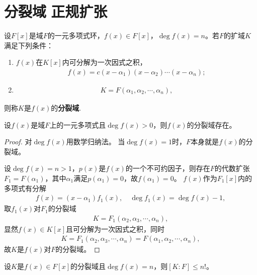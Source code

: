 \documentclass[../../main.tex]{subfiles}%
\begin{document}
\section{分裂域$\,\,$正规扩张}

\begin{definition}
设$F[x]$是域$F$的一元多项式环，$f(x)\in F[x]$，$\deg f(x)=n$。若$F$的扩域$K$满足下列条件：
\begin{enumerate}[(1)]
\item $f(x)$在$K[x]$内可分解为一次因式之积，
\begin{align}
f(x)=c(x-\alpha_1)(x-\alpha_2)\cdots(x-\alpha_n);\label{eq:split-fact}
\end{align}
\item \begin{align}K=F(\alpha_1,\alpha_2,\cdots,\alpha_n),\label{eq:split-gen}
\end{align}
\end{enumerate}
则称$K$是$f(x)$的\textbf{分裂域}.
\end{definition}

\begin{theorem}
设$f(x)$是域$F$上的一元多项式且$\deg f(x)>0$，则$f(x)$的分裂域存在。
\end{theorem}
\begin{proof}

对$\deg f(x)$用数学归纳法。
当$\deg f(x)=1$时，$F$本身就是$f(x)$的分裂域。

设$\deg f(x)=n>1$，$p(x)$是$f(x)$的一个不可约因子，则存在$F$的代数扩张$F_1=F(\alpha_1)$，其中$\alpha_1$满足$p(\alpha_1)=0$，故$f(\alpha_1)=0$。
$f(x)$作为$F_1[x]$内的多项式有分解
\begin{align*}
f(x)=(x-\alpha_1)f_1(x),\quad \deg f_1(x)=\deg f(x)-1,
\end{align*}
取$f_1(x)$对$F_1$的分裂域
\begin{align*}
K=F_1(\alpha_2,\alpha_3,\cdots,\alpha_n),
\end{align*}
显然$f(x)\in K[x]$且可分解为一次因式之积，同时
\begin{align*}
K=F_1(\alpha_2,\alpha_3,\cdots,\alpha_n)=F(\alpha_1,\alpha_2,\cdots,\alpha_n),
\end{align*}
故$K$是$f(x)$对$F$的分裂域。

\end{proof}

\begin{corollary}
设$K$是$f(x)\in F[x]$的分裂域且$\deg f(x)=n$，则$[K:F]\leqslant n!$。
\end{corollary}
\end{document}
